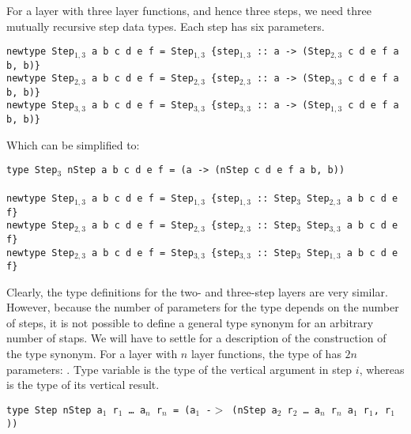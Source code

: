 For a layer with three layer functions, and hence three steps, we need three mutually recursive step data types. Each step has six parameters.

\begin{small}
{\tt newtype Step$_{1,3}$ a b c d e f = Step$_{1,3}$ \{step$_{1,3}$}\verb| :: |{\tt a -> (Step$_{2,3}$ c d e f a b, b)\}}\\
{\tt newtype Step$_{2,3}$ a b c d e f = Step$_{2,3}$ \{step$_{2,3}$}\verb| :: |{\tt a -> (Step$_{3,3}$ c d e f a b, b)\}}\\
{\tt newtype Step$_{3,3}$ a b c d e f = Step$_{3,3}$ \{step$_{3,3}$}\verb| :: |{\tt a -> (Step$_{1,3}$ c d e f a b, b)\}}
\end{small}

Which can be simplified to:

\begin{small}
{\tt type Step$_3$ nStep a b c d e f = (a -> (nStep c d e f a b, b))}\\
\\
{\tt newtype Step$_{1,3}$ a b c d e f = Step$_{1,3}$ \{step$_{1,3}$}\verb| :: |{\tt Step$_3$ Step$_{2,3}$ a b c d e f\} }\\
{\tt newtype Step$_{2,3}$ a b c d e f = Step$_{2,3}$ \{step$_{2,3}$}\verb| :: |{\tt Step$_3$ Step$_{3,3}$ a b c d e f\} }\\
{\tt newtype Step$_{2,3}$ a b c d e f = Step$_{3,3}$ \{step$_{3,3}$}\verb| :: |{\tt Step$_3$ Step$_{1,3}$ a b c d e f\} }
\end{small}

Clearly, the type definitions for the two- and three-step layers are very similar. However, because the number of parameters for the type depends on the number of steps, it is not possible to define a general type synonym  for an arbitrary number of staps. We will have to settle for a description of the construction of the type synonym. For a layer with $n$ layer functions, the type of  has $2n$ parameters: . Type variable  is the type of the vertical argument in step $i$, whereas  is the type of its vertical result. 

\begin{small}
\begin{tabbing}
{\tt type St}\={\tt ep nStep a$_1$ r$_1$ \dots ~a$_n$ r$_n$ = (a$_1$ -$>$  (nStep a$_2$ r$_2$ \dots ~a$_n$ r$_n$ a$_1$ r$_1$, r$_1$)) }
\end{tabbing}
\end{small}


